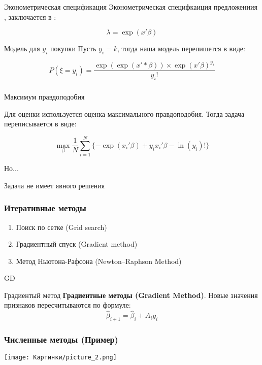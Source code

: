 \documentclass[unicode]{beamer}
\begin{document}
\begin{frame}
	\frametitle{\insertsubtitle}
	\begin{block}{Эконометрическая спецификация}
		Эконометрическая специфкаиция предложениия , заключается в :
		
		\[
		\lambda = \exp(x'\beta)
		\]

	\end{block}\pause


	\begin{block}{Модель для $y_i$ покупки}
		Пусть $y_i = k$, тогда наша модель перепишется в виде:
		
	\[
	P(\xi = y_i) = \dfrac{\exp(\exp(x' * \beta)) \times \exp(x'\beta)^{y_{i}}}{y_i!}
	\]
		
		
	\end{block}
\end{frame}

\begin{frame}
	\frametitle{\insertsubtitle}
	\begin{block}{Максимум правдоподобия}
		
		Для оценки используется оценка максимального правдоподобия. Тогда задача переписывается в виде:

		$$\max\limits_{{\beta}}\dfrac{1}{N}\sum_{i = 1}^{N}\{-\exp(x_{i}'\beta) + y_{i}x_{i}'\beta - \ln(y_i)!\}$$

	\end{block}

	\begin{block}{Но...}
		
		 Задача не имеет явного решения
		
		
	\end{block}
\end{frame}
\begin{frame}
	\frametitle{Итеративные методы}
	\begin{enumerate}
		\item Поиск по сетке (Grid search)
		
		\item Градиентный спуск (Gradient method)
		
		\item Метод Ньютона-Рафсона (Newton–Raphson Method)
		
	\end{enumerate}
\end{frame}
\begin{frame}{GD}
		\begin{block}{Градиентый метод}
			\textbf{Градиентные методы (Gradient Method)}. Новые значения признаков пересчитываются по формуле:
			$$\hat{\beta}_{i+1} = \hat{\beta}_{i} + A_{i}g_{i} $$ 
		\end{block}

\end{frame}
\begin{frame}
	\frametitle{Численные методы (Пример)}
	
	\centering
		\texttt{[image: Картинки/picture\_2.png]}

\end{frame}
\end{document}
